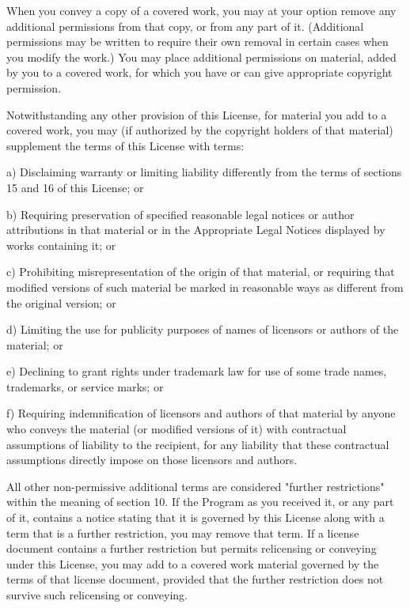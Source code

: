 \documentclass[11pt]{book}
\begin{document}
    When you convey a copy of a covered work, you may at your option
    remove any additional permissions from that copy, or from any part of
    it.  (Additional permissions may be written to require their own
    removal in certain cases when you modify the work.)  You may place
    additional permissions on material, added by you to a covered work,
    for which you have or can give appropriate copyright permission.

    Notwithstanding any other provision of this License, for material you
    add to a covered work, you may (if authorized by the copyright holders of
    that material) supplement the terms of this License with terms:

    a) Disclaiming warranty or limiting liability differently from the
    terms of sections 15 and 16 of this License; or

    b) Requiring preservation of specified reasonable legal notices or
    author attributions in that material or in the Appropriate Legal
    Notices displayed by works containing it; or

    c) Prohibiting misrepresentation of the origin of that material, or
    requiring that modified versions of such material be marked in
    reasonable ways as different from the original version; or

    d) Limiting the use for publicity purposes of names of licensors or
    authors of the material; or

    e) Declining to grant rights under trademark law for use of some
    trade names, trademarks, or service marks; or

    f) Requiring indemnification of licensors and authors of that
    material by anyone who conveys the material (or modified versions of
    it) with contractual assumptions of liability to the recipient, for
    any liability that these contractual assumptions directly impose on
    those licensors and authors.

    All other non-permissive additional terms are considered "further
    restrictions" within the meaning of section 10.  If the Program as you
    received it, or any part of it, contains a notice stating that it is
    governed by this License along with a term that is a further
    restriction, you may remove that term.  If a license document contains
    a further restriction but permits relicensing or conveying under this
    License, you may add to a covered work material governed by the terms
    of that license document, provided that the further restriction does
    not survive such relicensing or conveying.
\end{document}
